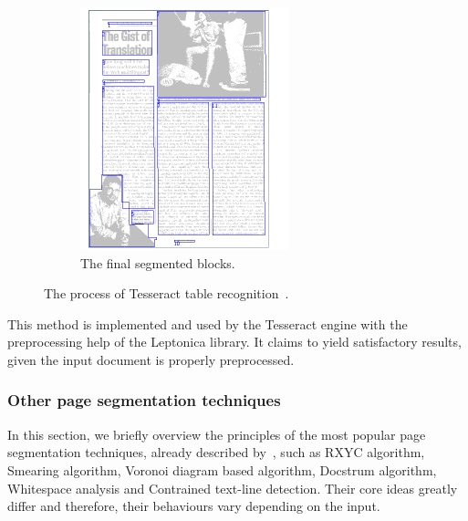 \begin{figure}[p]
\begin{subfigure}{0.30\textwidth}
\includegraphics[width=\linewidth]{img/tabStopDetection/tessPageSegm5.pdf}
\caption{The final segmented blocks.}
\label{fig:segmentationTesseract5}
\end{subfigure}
\caption{The process of Tesseract table recognition~\cite{tesseractSegmentationTab}.}
\label{fig:segmentationTesseract}
\end{figure}

This method is implemented and used by the Tesseract engine with the preprocessing help of the Leptonica library. It claims to yield satisfactory results, given the input document is properly preprocessed.

\subsubsection{Other page segmentation techniques}

In this section, we briefly overview the principles of the most popular page segmentation techniques, already described by~\citet{segmentationOverview}, such as RXYC algorithm, Smearing algorithm, Voronoi diagram based algorithm, Docstrum algorithm, Whitespace analysis and Contrained text-line detection. Their core ideas greatly differ and therefore, their behaviours vary depending on the input.

